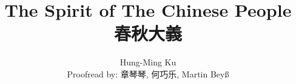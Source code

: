 \documentclass[a4paper,12pt]{book}
\begin{document}
\title{The Spirit of The Chinese People \\ 春秋大義}
\author{Hung-Ming Ku \\ Proofread by: 章琴琴, 何巧乐, Martin Bey\ss}

\maketitle 
\clearpage
\mbox{}
\newpage


\clearpage
\mbox{}
\newpage

\tableofcontents

\frontmatter
    
    

\mainmatter
    
    
    
    
    
    
    
    \begin{appendices}
        
    \end{appendices}

    
    
\end{document}
